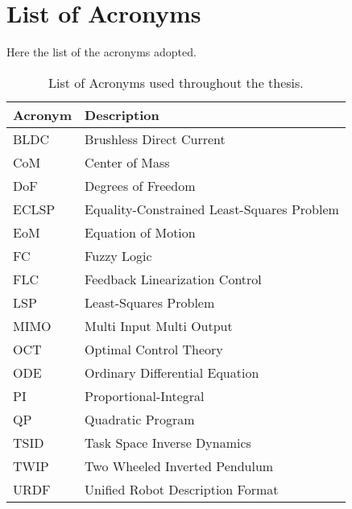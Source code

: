 \chapter*{List of Acronyms}
\label{ch:List_of_acronyms}
Here the list of the acronyms adopted.

\begin{table}[h]
    \centering
    \caption{List of Acronyms used throughout the thesis.}
    \renewcommand{\arraystretch}{1.5} %
    \begin{tabular}{@{}l@{\hspace{3cm}}l@{}}
    \toprule
    \textbf{Acronym} & \textbf{Description} \\
    \midrule
    BLDC  & Brushless Direct Current \\
    CoM  & Center of Mass \\
    DoF & Degrees of Freedom \\
    ECLSP & Equality-Constrained Least-Squares Problem \\
    EoM & Equation of Motion \\
    FC & Fuzzy Logic \\
    FLC & Feedback Linearization Control \\
    LSP & Least-Squares Problem \\
    MIMO & Multi Input Multi Output \\
    OCT & Optimal Control Theory \\
    ODE & Ordinary Differential Equation \\
    PI & Proportional-Integral \\
    QP & Quadratic Program \\
    TSID & Task Space Inverse Dynamics \\
    TWIP & Two Wheeled Inverted Pendulum \\
    URDF & Unified Robot Description Format \\
    \bottomrule
    \end{tabular}
\end{table}
